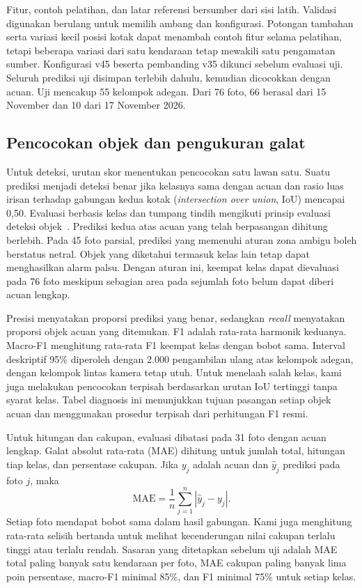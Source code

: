 \documentclass[conference,a4paper]{IEEEtran}
\begin{document}
Fitur, contoh pelatihan, dan latar referensi bersumber dari sisi latih. Validasi digunakan berulang untuk memilih ambang dan konfigurasi. Potongan tambahan serta variasi kecil posisi kotak dapat menambah contoh fitur selama pelatihan, tetapi beberapa variasi dari satu kendaraan tetap mewakili satu pengamatan sumber. Konfigurasi v45 beserta pembanding v35 dikunci sebelum evaluasi uji. Seluruh prediksi uji disimpan terlebih dahulu, kemudian dicocokkan dengan acuan. Uji mencakup 55 kelompok adegan. Dari 76 foto, 66 berasal dari 15 November dan 10 dari 17 November 2026.

\subsection{Pencocokan objek dan pengukuran galat}
Untuk deteksi, urutan skor menentukan pencocokan satu lawan satu. Suatu prediksi menjadi deteksi benar jika kelasnya sama dengan acuan dan rasio luas irisan terhadap gabungan kedua kotak (\textit{intersection over union}, IoU) mencapai 0,50. Evaluasi berbasis kelas dan tumpang tindih mengikuti prinsip evaluasi deteksi objek~\cite{voc}. Prediksi kedua atas acuan yang telah berpasangan dihitung berlebih. Pada 45 foto parsial, prediksi yang memenuhi aturan zona ambigu boleh berstatus netral. Objek yang diketahui termasuk kelas lain tetap dapat menghasilkan alarm palsu. Dengan aturan ini, keempat kelas dapat dievaluasi pada 76 foto meskipun sebagian area pada sejumlah foto belum dapat diberi acuan lengkap.

Presisi menyatakan proporsi prediksi yang benar, sedangkan \textit{recall} menyatakan proporsi objek acuan yang ditemukan. F1 adalah rata-rata harmonik keduanya. Macro-F1 menghitung rata-rata F1 keempat kelas dengan bobot sama. Interval deskriptif 95\% diperoleh dengan 2.000 pengambilan ulang atas kelompok adegan, dengan kelompok lintas kamera tetap utuh. Untuk menelaah salah kelas, kami juga melakukan pencocokan terpisah berdasarkan urutan IoU tertinggi tanpa syarat kelas. Tabel diagnosis ini menunjukkan tujuan pasangan setiap objek acuan dan menggunakan prosedur terpisah dari perhitungan F1 resmi.

Untuk hitungan dan cakupan, evaluasi dibatasi pada 31 foto dengan acuan lengkap. Galat absolut rata-rata (MAE) dihitung untuk jumlah total, hitungan tiap kelas, dan persentase cakupan. Jika $y_j$ adalah acuan dan $\hat y_j$ prediksi pada foto $j$, maka
\begin{equation}
\mathrm{MAE}=\frac{1}{n}\sum_{j=1}^{n}|\hat y_j-y_j|. \label{eq:mae}
\end{equation}
Setiap foto mendapat bobot sama dalam hasil gabungan. Kami juga menghitung rata-rata selisih bertanda untuk melihat kecenderungan nilai cakupan terlalu tinggi atau terlalu rendah. Sasaran yang ditetapkan sebelum uji adalah MAE total paling banyak satu kendaraan per foto, MAE cakupan paling banyak lima poin persentase, macro-F1 minimal 85\%, dan F1 minimal 75\% untuk setiap kelas.
\end{document}
